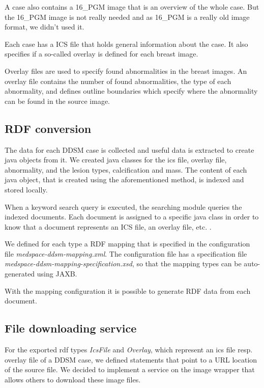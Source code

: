A case also contains a 16\_PGM image that is an overview of the whole case. But the 16\_PGM image is not really needed and as 16\_PGM is a really old image format, we didn't used it.

Each case has a ICS file that holds general information about the case. It also specifies if a so-called overlay is defined for each breast image. 

Overlay files are used to specify found abnormalities in the breast images. An overlay file contains the number of found abnormalities, the type of each abnormality, and defines outline boundaries which specify where the abnormality can be found in the source image.

\subsection{RDF conversion}

The data for each DDSM case is collected and useful data is extracted to create java objects from it. We created java classes for the ics file, overlay file, abnormality, and the lesion types, calcification and mass. The content of each java object, that is created using the aforementioned method, is indexed and stored locally. 

When a keyword search query is executed, the searching module queries the indexed documents. Each document is assigned to a specific java class in order to know that a document represents an ICS file, an overlay file, etc. .  

We defined for each type a RDF mapping that is specified in the configuration file \emph{medspace-ddsm-mapping.xml}. The configuration file has a specification file \emph{medspace-ddsm-mapping-specification.xsd}, so that the mapping types can be auto-generated using JAXB.

With the mapping configuration it is possible to generate RDF data from each document.

\subsection{File downloading service}

For the exported rdf types \emph{IcsFile} and \emph{Overlay}, which represent an ics file resp. overlay file of a DDSM case, we defined statements that point to a URL location of the source file. We decided to implement a service on the image wrapper that allows others to download these image files. 

